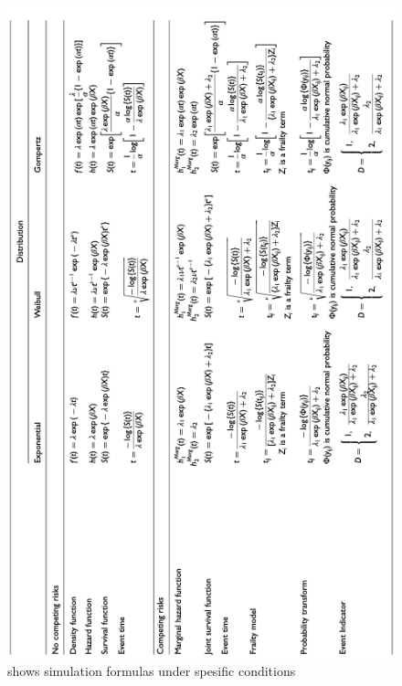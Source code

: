 \begin{figure}[h]
	\centering
	\includegraphics[scale=0.56 , angle=270]{Figures/COMPETING1.png}
	\caption{\parencite{meng_simulating_2023} shows simulation formulas under spesific conditions}
\end{figure}

